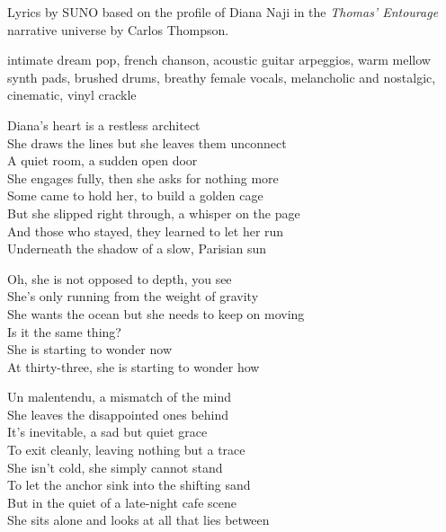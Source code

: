 
\begin{notes}
Lyrics by SUNO based on the profile of Diana Naji in the \emph{Thomas’ Entourage} narrative universe by Carlos Thompson.
\end{notes}
\begin{style}
intimate dream pop, french chanson, acoustic guitar arpeggios, warm mellow synth pads, brushed drums, breathy female vocals, melancholic and nostalgic, cinematic, vinyl crackle
\end{style}
\begin{lyrics}
Diana's heart is a restless architect\\
She draws the lines but she leaves them unconnect\\
A quiet room, a sudden open door\\
She engages fully, then she asks for nothing more\\
Some came to hold her, to build a golden cage\\
But she slipped right through, a whisper on the page\\
And those who stayed, they learned to let her run\\
Underneath the shadow of a slow, Parisian sun

Oh, she is not opposed to depth, you see\\
She's only running from the weight of gravity\\
She wants the ocean but she needs to keep on moving\\
Is it the same thing?\\ 
She is starting to wonder now\\
At thirty-three, she is starting to wonder how

Un malentendu, a mismatch of the mind\\
She leaves the disappointed ones behind\\
It's inevitable, a sad but quiet grace\\
To exit cleanly, leaving nothing but a trace\\
She isn't cold, she simply cannot stand\\
To let the anchor sink into the shifting sand\\
But in the quiet of a late-night cafe scene\\
She sits alone and looks at all that lies between


\end{lyrics}
